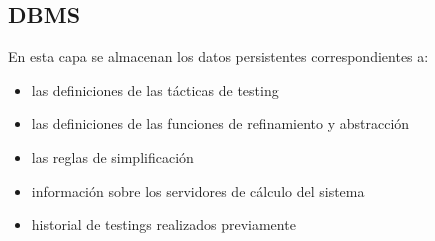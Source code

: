 \documentclass[a4paper,11pt]{article}
\begin{document}
\subsection{DBMS}
En esta capa se almacenan los datos persistentes correspondientes a:
\begin{itemize}
 \item las definiciones de las tácticas de testing
 \item las definiciones de las funciones de refinamiento y abstracción
 \item las reglas de simplificación 
 \item información sobre los servidores de cálculo del sistema
 \item historial de testings realizados previamente
\end{itemize}
\end{document}
